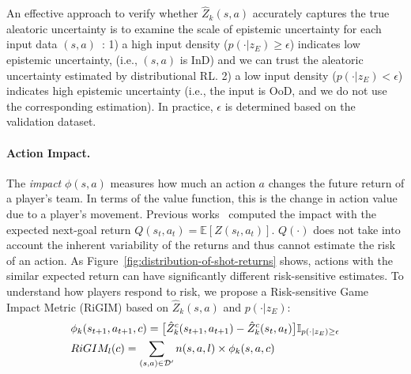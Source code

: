 \documentclass{article}
\newcommand{\condition}{z_{E}}
\newcommand{\state}{s}
\newcommand{\action}{a}
\newcommand{\agentIndex}{k}
\newcommand{\dataset}{\mathcal{D}}
\newcommand{\expect}{\mathbb{E}}
\newcommand{\confidence}{c}
\newcommand{\impact}{\phi}
\newcommand{\playerId}{l}
\newcommand{\sys}{RiGIM}
\newcommand{\system}{\sys\;}
\begin{document}
An effective approach to verify whether $\hat{Z}_{\agentIndex}(\state,\action)$ accurately captures the true aleatoric uncertainty is to examine the scale of epistemic uncertainty for each input data $(\state,\action)$~\cite{Mukhoti2021Uncertainty}: 1) a high input density ($p(\cdot|\condition)\geq\epsilon$) indicates low epistemic uncertainty,
(i.e., $(\state,\action)$ is InD)
and we can trust the aleatoric uncertainty estimated by distributional RL. 2) a low input density ($p(\cdot|\condition)<\epsilon$) indicates high epistemic uncertainty (i.e., the input is OoD, and we do not use the corresponding estimation). In practice, $\epsilon$ is determined based on the validation dataset.

\paragraph{Action Impact.}
The {\it impact} $\impact(\state,\action)$ measures how much an action $\action$ changes the future return of a player's team. In terms of the value function, this is the change in action value due to a player’s movement. 
Previous works~\cite{Routley2015Markov,Liu2018DRL,Decroos2019Actions} computed the impact with the expected next-goal return $Q(\state_{t},\action_{t})=\expect[Z(\state_{t},\action_{t})]$. $Q(\cdot)$ does not take into account the inherent variability of the returns and thus cannot estimate the risk of an action. As Figure~\ref{fig:distribution-of-shot-returns} shows, actions with the similar expected return can have significantly different risk-sensitive estimates. To understand how players respond to risk, we propose a Risk-sensitive Game Impact Metric (\system) based on $\hat{Z}_{\agentIndex}(\state,\action)$ and $p(\cdot|\condition)$:
\begin{align}
    &\impact_{\agentIndex}(\state_{t+1},\action_{t+1},\confidence)=\big[\hat{Z}^{\confidence}_{\agentIndex}(\state_{t+1},\action_{t+1})-
    \hat{Z}^{\confidence}_{\agentIndex}(\state_{t},\action_{t})\big]\mathbb{I}_{p(\cdot|\condition)\geq\epsilon}
    \nonumber\\
    &\sys_{\playerId}(\confidence)=\sum_{(\state,\action)\in\dataset^{\prime}}n(\state,\action,\playerId)\times\impact_{\agentIndex}(\state,\action,\confidence)\label{eqn:RIGIM}
    \vspace{-0.1in}
\end{align}
\end{document}
